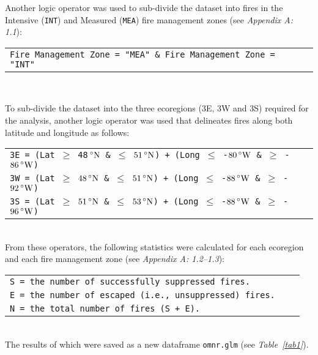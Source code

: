 \begin{spacing}{1.5}
\noindent Another logic operator was used to sub-divide the dataset into fires in the Intensive (\texttt{INT}) and Measured (\texttt{MEA}) fire management zones (see \emph{Appendix A: 1.1}): \\

\begin{tabular}{ll}
\texttt{Fire Management Zone = "MEA" \& Fire Management Zone = "INT"}
\end{tabular}\\

\clearpage

\noindent To sub-divide the dataset into the three ecoregions (3E, 3W and 3S)  required for the analysis, another logic operator was used that delineates fires along both latitude and longitude as follows: \\



\begin{tabular}{ll}
\texttt{3E = (Lat $\geq$ 48$\,^{\circ}{\rm N}$ \& $\leq$ $51\,^{\circ}{\rm N}$) + (Long $\leq$ -$80\,^{\circ}{\rm W}$ \& $\geq$ -$86\,^{\circ}{\rm W}$)} \\

\texttt{3W = (Lat $\geq$ $48\,^{\circ}{\rm N}$ \& $\leq$ $51\,^{\circ}{\rm N}$) + (Long $\leq$ -$88\,^{\circ}{\rm W}$ \& $\geq$ -$92\,^{\circ}{\rm W}$)} \\

\texttt{3S = (Lat $\geq$ $51\,^{\circ}{\rm N}$ \& $\leq$ $53\,^{\circ}{\rm N}$) + (Long $\leq$ -$88\,^{\circ}{\rm W}$ \& $\geq$ -$96\,^{\circ}{\rm W}$)} \\
\end{tabular}\\

\noindent From these operators, the following statistics were calculated for each ecoregion and each fire management zone (see \emph{Appendix A: 1.2--1.3}): \\

\begin{tabular}{lll}
\texttt{S  = the number of successfully suppressed fires.} \\
\texttt{E  = the number of escaped (i.e., unsuppressed) fires.} \\
\texttt{N  = the total number of fires (S + E).} \\
\end{tabular}\\

\noindent The results of which were saved as a new dataframe \texttt{omnr.glm} (see \emph{Table~\ref{tab1}}).



\end{spacing}
